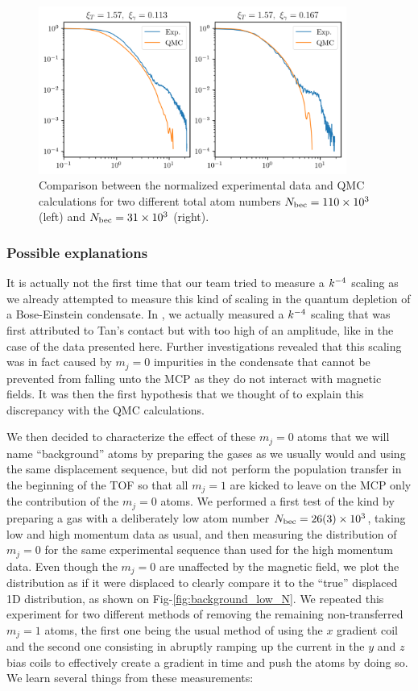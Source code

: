 \begin{figure}
    \centering
    \includegraphics[width=0.9\textwidth]{Fig/Chapter5/QMC_comparison.png}
    \caption{Comparison between the normalized experimental data and QMC calculations for two different total atom numbers $N_{\rm{bec}}=110 \times 10^3$ (left) and $N_{\rm{bec}}=31 \times 10^3$ (right).}
    \label{fig:1D_QMC_comparison}
\end{figure}

\subsubsection{Possible explanations}

It is actually not the first time that our team tried to measure a $k^{-4}$ scaling as we already attempted to measure this kind of scaling in the quantum depletion of a Bose-Einstein condensate. In \cite{chang2016momentum}, we actually measured a $k^{-4}$ scaling that was first attributed to Tan's contact but with too high of an amplitude, like in the case of the data presented here. Further investigations \cite{cayla_these} revealed that this scaling was in fact caused by $m_j=0$ impurities in the condensate that cannot be prevented from falling unto the MCP as they do not interact with magnetic fields. It was then the first hypothesis that we thought of to explain this discrepancy with the QMC calculations.

We then decided to characterize the effect of these $m_j=0$ atoms that we will name ``background'' atoms by preparing the gases as we usually would and using the same displacement sequence, but did not perform the population transfer in the beginning of the TOF so that all $m_j=1$ are kicked to leave on the MCP only the contribution of the $m_j=0$ atoms. We performed a first test of the kind by preparing a gas with a deliberately low atom number $N_{\rm{bec}}=26(3) \times 10^3$, taking low and high momentum data as usual, and then measuring the distribution of $m_j=0$ for the same experimental sequence than used for the high momentum data. Even though the $m_j=0$ are unaffected by the magnetic field, we plot the distribution as if it were displaced to clearly compare it to the ``true'' displaced 1D distribution, as shown on Fig-\ref{fig:background_low_N}. We repeated this experiment for two different methods of removing the remaining non-transferred $m_j=1$ atoms, the first one being the usual method of using the $x$ gradient coil and the second one consisting in abruptly ramping up the current in the $y$ and $z$ bias coils to effectively create a gradient in time and push the atoms by doing so. We learn several things from these measurements:

